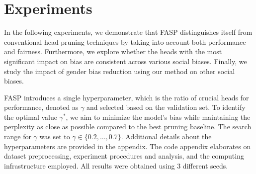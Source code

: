 \documentclass[letterpaper]{article} %
\newcommand{\goncalo}[1]
{\textcolor{orange}{{\bf}{\em #1}{\bf}}}
\begin{document}
\section{Experiments}\label{exp_details}

In the following experiments, we demonstrate that FASP distinguishes itself from conventional head pruning techniques by taking into account both performance and fairness. Furthermore, we explore whether the heads with the most significant impact on bias are consistent across various social biases. Finally, we study the impact of gender bias reduction using our method on other social biases. 

FASP introduces a single hyperparameter, which is the ratio of crucial heads for performance, denoted as $\gamma$ and selected based on the validation set. To identify the optimal value $\gamma^*$, we aim to minimize the model's bias while maintaining the perplexity as close as possible compared to the best pruning baseline. The search range for $\gamma$ was set to $\gamma \in \{0.2, ..., 0.7\}$. Additional details about the hyperparameters are provided in the appendix. The code appendix elaborates on dataset preprocessing, experiment procedures and analysis, and the computing infrastructure employed. All results were obtained using $3$ different seeds.








\end{document}
